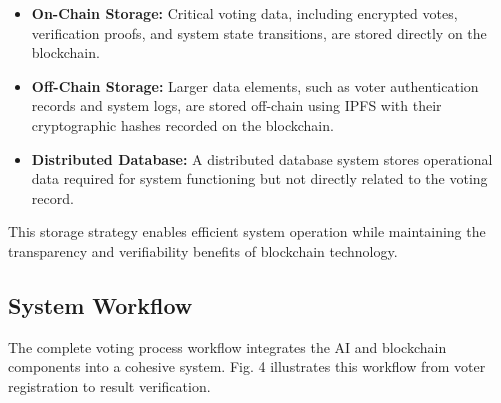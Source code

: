 \documentclass[conference]{IEEEtran}
\begin{document}
\begin{itemize}
    \item \textbf{On-Chain Storage:} Critical voting data, including encrypted votes, verification proofs, and system state transitions, are stored directly on the blockchain.
    
    \item \textbf{Off-Chain Storage:} Larger data elements, such as voter authentication records and system logs, are stored off-chain using IPFS with their cryptographic hashes recorded on the blockchain.
    
    \item \textbf{Distributed Database:} A distributed database system stores operational data required for system functioning but not directly related to the voting record.
\end{itemize}

This storage strategy enables efficient system operation while maintaining the transparency and verifiability benefits of blockchain technology.

\subsection{System Workflow}
The complete voting process workflow integrates the AI and blockchain components into a cohesive system. Fig. 4 illustrates this workflow from voter registration to result verification.
\end{document}
